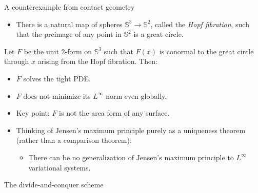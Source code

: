 \documentclass[10pt]{beamer}
\begin{document}
\begin{frame}{A counterexample from contact geometry}
    \begin{itemize}
        \item There is a natural map of spheres $\mathbb S^3 \to \mathbb S^2$, called the \emph{Hopf fibration}, such that the preimage of any point in $\mathbb S^2$ is a great circle. 
    \end{itemize}

    \begin{theorem}[B '24]
    Let $F$ be the unit $2$-form on $\mathbb S^3$ such that $F(x)$ is conormal to the great circle through $x$ arising from the Hopf fibration.
    Then: 
\begin{itemize}
    \item $F$ solves the tight PDE.  
    \item $F$ does not minimize its $L^\infty$ norm even globally.
\end{itemize}
\end{theorem}

\begin{itemize}
\item Key point: $F$ is not the area form of any surface.  
\item Thinking of Jensen's maximum principle purely as a uniqueness theorem (rather than a comparison theorem):  
\begin{itemize}
\item There can be no generalization of Jensen's maximum principle to $L^\infty$ variational systems.
\end{itemize}
\end{itemize}
\end{frame}

\begin{frame}{The divide-and-conquer scheme}
    
\end{frame}
\end{document}
